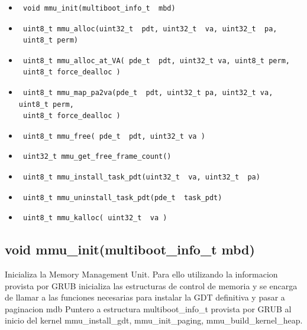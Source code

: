\documentclass[a4paper,10pt]{article}
\begin{document}
\begin{itemize}
\item \begin{verbatim} void mmu_init(multiboot_info_t  mbd) \end{verbatim} 
\item \begin{verbatim} uint8_t mmu_alloc(uint32_t  pdt, uint32_t  va, uint32_t  pa,
 uint8_t perm) \end{verbatim} 
\item \begin{verbatim} uint8_t mmu_alloc_at_VA( pde_t  pdt, uint32_t va, uint8_t perm,
 uint8_t force_dealloc ) \end{verbatim} 
\item \begin{verbatim} uint8_t mmu_map_pa2va(pde_t  pdt, uint32_t pa, uint32_t va, uint8_t perm,
 uint8_t force_dealloc ) \end{verbatim}    
\item \begin{verbatim} uint8_t mmu_free( pde_t  pdt, uint32_t va ) \end{verbatim} 
\item \begin{verbatim} uint32_t mmu_get_free_frame_count() \end{verbatim} 
\item \begin{verbatim} uint8_t mmu_install_task_pdt(uint32_t  va, uint32_t  pa) \end{verbatim} 
\item \begin{verbatim} uint8_t mmu_uninstall_task_pdt(pde_t  task_pdt) \end{verbatim} 
\item \begin{verbatim} uint8_t mmu_kalloc( uint32_t  va ) \end{verbatim} 
\end{itemize}


\subsection*{ void mmu\_init(multiboot\_info\_t  mbd)}
Inicializa la Memory Management Unit. Para ello utilizando la informacion provista por GRUB inicializa las estructuras de control de memoria y se encarga de llamar a las funciones necesarias para instalar la GDT definitiva y pasar a paginacion mdb Puntero a estructura multiboot\_info\_t provista por GRUB al inicio del kernel mmu\_install\_gdt, mmu\_init\_paging, mmu\_build\_kernel\_heap.
\end{document}
